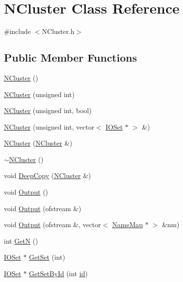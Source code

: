 \hypertarget{class_n_cluster}{
\section{NCluster Class Reference}
\label{class_n_cluster}
}


{\ttfamily \#include $<$NCluster.h$>$}

\subsection*{Public Member Functions}
\begin{DoxyCompactItemize}
\item 
\hyperlink{class_n_cluster_af90ad520f3efec3f3c0b93ba9f46debc}{NCluster} ()
\item 
\hyperlink{class_n_cluster_ab539b74dc75b6dd1db12bdb14a304d1f}{NCluster} (unsigned int)
\item 
\hyperlink{class_n_cluster_ac2d41df0107c1f72c9574e066d61a7e0}{NCluster} (unsigned int, bool)
\item 
\hyperlink{class_n_cluster_ab5480440512649ea2cee9d47d1684732}{NCluster} (unsigned int, vector$<$ \hyperlink{class_i_o_set}{IOSet} $\ast$ $>$ \&)
\item 
\hyperlink{class_n_cluster_a7f86cfa4150010e117f7520f34bbc6a4}{NCluster} (\hyperlink{class_n_cluster}{NCluster} \&)
\item 
\hyperlink{class_n_cluster_aae72a31bc6c2f05934a6d2248d966be5}{$\sim$NCluster} ()
\item 
void \hyperlink{class_n_cluster_a84dd370bb3e73f192187156cd7dba57b}{DeepCopy} (\hyperlink{class_n_cluster}{NCluster} \&)
\item 
void \hyperlink{class_n_cluster_a695c426f13c2fb78015c2f6d8714dc38}{Output} ()
\item 
void \hyperlink{class_n_cluster_afb92f84876326645c2d3e46c011c6fdf}{Output} (ofstream \&)
\item 
void \hyperlink{class_n_cluster_a5f75034c596cda89b823bb842f54019e}{Output} (ofstream \&, vector$<$ \hyperlink{class_name_map}{NameMap} $\ast$ $>$ \&nm)
\item 
int \hyperlink{class_n_cluster_a5e91f8c38a0122031c3f921b94e3a688}{GetN} ()
\item 
\hyperlink{class_i_o_set}{IOSet} $\ast$ \hyperlink{class_n_cluster_a7d197e1cf217fe1ce95b0ba0b4ee40bc}{GetSet} (int)
\item 
\hyperlink{class_i_o_set}{IOSet} $\ast$ \hyperlink{class_n_cluster_a5d4ddbb124fc5d9c9cc706312ec80476}{GetSetById} (int \hyperlink{class_n_cluster_a9360cadd4e338b91de61f86997acc890}{id})

\end{DoxyCompactItemize}
